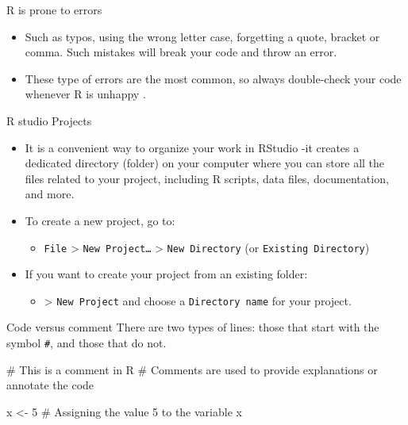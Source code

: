 \documentclass[
  ignorenonframetext,
  aspectratio=169,
]{beamer}
\newenvironment{Shaded}{\begin{snugshade}}{\end{snugshade}}
\newcommand{\CommentTok}[1]{\textcolor[rgb]{0.37,0.37,0.37}{#1}}
\newcommand{\DecValTok}[1]{\textcolor[rgb]{0.68,0.00,0.00}{#1}}
\newcommand{\NormalTok}[1]{\textcolor[rgb]{0.00,0.23,0.31}{#1}}
\newcommand{\OtherTok}[1]{\textcolor[rgb]{0.00,0.23,0.31}{#1}}
\providecommand{\tightlist}{%
  \setlength{\itemsep}{0pt}\setlength{\parskip}{0pt}}\usepackage{longtable,booktabs,array}
\begin{document}
\begin{frame}{R is prone to errors}
\label{r-is-prone-to-errors}
\begin{itemize}
\item
   Such as typos, using the wrong letter case, forgetting a
  quote, bracket or comma. Such mistakes will break your code and throw
  an error.
\item
   These type of errors are the most common,
  so always double-check your code whenever R is unhappy
  .
\end{itemize}
\end{frame}

\begin{frame}[fragile]{R studio Projects}
\label{r-studio-projects}
\begin{itemize}
\item
  It is a convenient way to organize your work in RStudio -it creates a
  dedicated directory (folder) on your computer where you can store all
  the files related to your project, including R scripts, data files,
  documentation, and more.
\item
  To create a new project, go to:

  \begin{itemize}
  \tightlist
  \item
    \texttt{File} \textgreater{} \texttt{New\ Project…} \textgreater{}
    \texttt{New\ Directory} (or \texttt{Existing\ Directory})
  \end{itemize}
\item
  If you want to create your project from an existing folder:

  \begin{itemize}
  \tightlist
  \item
    \textgreater{} \texttt{New\ Project} and choose a
    \texttt{Directory\ name} for your project.
  \end{itemize}
\end{itemize}
\end{frame}

\begin{frame}[fragile]{Code versus comment}
\label{code-versus-comment}
There are two types of lines: those that start with the symbol
\texttt{\#}, and those that do not.

\begin{Shaded}
\begin{Highlighting}[numbers=left,,]
\CommentTok{\# This is a comment in R}
\CommentTok{\# Comments are used to provide explanations or annotate the code}

\NormalTok{x }\OtherTok{\textless{}{-}} \DecValTok{5}  \CommentTok{\# Assigning the value 5 to the variable x}
\end{Highlighting}
\end{Shaded}
\end{frame}
\end{document}
